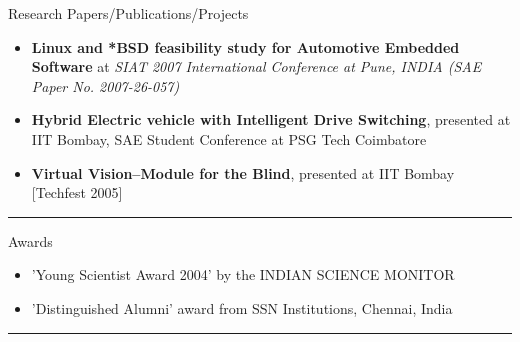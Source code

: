 \documentclass[11pt,oneside]{article}
\newenvironment{ressection}[1]{
	\vspace{4pt}
	{\fontfamily{phv}\selectfont\Large#1}
	\begin{itemize}
	\vspace{3pt}
}{
	\end{itemize}
}
\newcommand{\resitem}[1]{
	\vspace{-4pt}
	\item \begin{flushleft} #1 \end{flushleft}
}
\begin{document}
\begin{ressection}{Research Papers/Publications/Projects}
      \resitem{\textbf{Linux and *BSD feasibility study for Automotive
          Embedded Software} at \emph{SIAT 2007 International Conference at
          Pune, INDIA (SAE Paper No. 2007-26-057)}}

      \resitem{\textbf{Hybrid Electric vehicle with Intelligent Drive
          Switching}, presented at IIT Bombay, SAE Student Conference at PSG
        Tech Coimbatore}

      \resitem{\textbf{Virtual Vision--Module for the Blind}, presented at IIT
        Bombay [Techfest 2005]}
\end{ressection}
\rule{\textwidth}{.5pt}

\begin{ressection}{Awards}
        
        \resitem{'Young Scientist Award 2004' by the INDIAN SCIENCE MONITOR}
        \resitem{'Distinguished Alumni' award from SSN Institutions,
            Chennai, India}

\end{ressection}
\rule{\textwidth}{.5pt}




    




\end{document}
